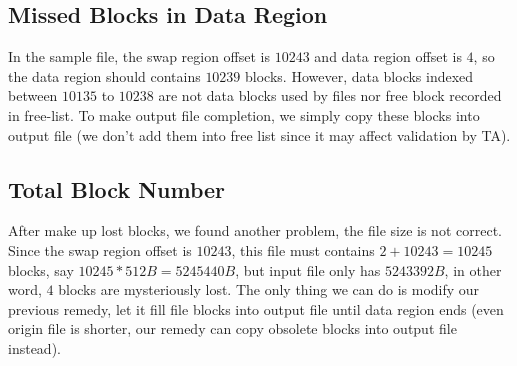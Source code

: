 \documentclass{article}
\begin{document}
	\subsection{Missed Blocks in Data Region}
	In the sample file, the swap region offset is $10243$ and data region offset is $4$, so the data region should contains $10239$ blocks. However, data blocks indexed between $10135$ to $10238$ are not data blocks used by files nor free block recorded in free-list. To make output file completion, we simply copy these blocks into output file (we don't add them into free list since it may affect validation by TA).
	
	\subsection{Total Block Number}
	After make up lost blocks, we found another problem, the file size is not correct. Since the swap region offset is $10243$, this file must contains $2+10243=10245$ blocks, say $10245*512B=5245440B$, but input file only has $5243392B$, in other word, $4$ blocks are mysteriously lost. The only thing we can do is modify our previous remedy, let it fill file blocks into output file until data region ends (even origin file is shorter, our remedy can copy obsolete blocks into output file instead).
	
\end{document}
